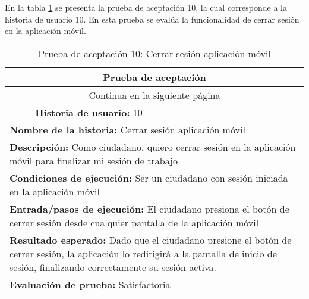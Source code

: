 En la tabla \ref{tab:prueba-10} se presenta la prueba de aceptación 10, la cual corresponde a la historia de usuario 10.
En esta prueba se evalúa la funcionalidad de cerrar sesión en la aplicación móvil.

\begin{longtable}{|p{6.7cm}|p{6.7cm}|}
    \caption{Prueba de aceptación 10: Cerrar sesión aplicación móvil} \label{tab:prueba-10}
    \\
    \hline
    \multicolumn{2}{|c|}{\textbf{Prueba de aceptación}}                                                                                                                                                                             \\
    \hline

    \endfirsthead

    \hline
    \endhead

    \hline
    \multicolumn{2}{|c|}{{Continua en la siguiente página}}                                                                                                                                                                         \\
    \hline
    \endfoot

    \hline
    \endlastfoot
    \multicolumn{1}{|p{6.7cm}|}{\textbf{Número} 10 } & \multicolumn{1}{|p{6.7cm}|}{\textbf{Historia de usuario:} 10}                                                                                                                \\
    \hline
    \multicolumn{2}{|p{13.4cm}|}{\textbf{Nombre de la historia:} Cerrar sesión aplicación móvil }                                                                                                                                   \\
    \hline
    \multicolumn{2}{|p{13.4cm}|}{\textbf{Descripción:} Como ciudadano, quiero cerrar sesión en la aplicación móvil para finalizar mi sesión de trabajo}                                                                             \\
    \hline
    \multicolumn{2}{|p{13.4cm}|}{\textbf{Condiciones de ejecución:} Ser un ciudadano con sesión iniciada en la aplicación móvil}                                                                                                    \\
    \hline
    \multicolumn{2}{|p{13.4cm}|}{\textbf{Entrada/pasos de ejecución:} El ciudadano presiona el botón de cerrar sesión desde cualquier pantalla de la aplicación móvil}                                                              \\
    \hline
    \multicolumn{2}{|p{13.4cm}|}{\textbf{Resultado esperado:} Dado que el ciudadano presione el botón de cerrar sesión, la aplicación lo redirigirá a la pantalla de inicio de sesión, finalizando correctamente su sesión activa.} \\
    \hline
    \multicolumn{2}{|p{13.4cm}|}{\textbf{Evaluación de prueba:} Satisfactoria}                                                                                                                                                      \\
    \hline
\end{longtable}

